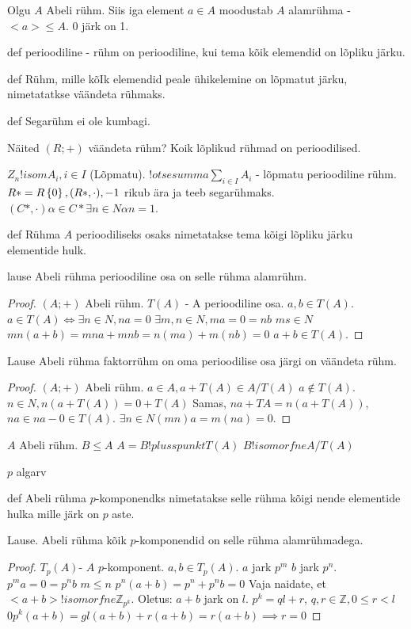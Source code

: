 \documentclass[12pt]{report}
\numberwithin{equation}{section}
\theoremstyle{definition}
\theoremstyle{plain}
\begin{document}
Olgu $A$ Abeli r\"uhm. Siis iga element $a \in A$ moodustab $A$ alamr\"uhma - $<a> \leq A$. $0$ järk on 1.

def perioodiline - r\"uhm on perioodiline, kui tema kõik elemendid on lõpliku järku.

def R\"uhm, mille kõIk elemendid peale \"uhikelemine on lõpmatut järku, nimetatatkse väändeta r\"uhmaks.

def Segar\"uhm ei ole kumbagi.

Näited
$(R;+)$ väändeta rühm?
Koik lõplikud r\"uhmad on perioodilised.

$Z_n !isom A_i , i \in I$ (Lõpmatu). $!otsesumma \sum \limits_{i \in I} A_i$ - lõpmatu perioodiline r\"uhm.
$R* = R \\ \left\lbrace 0 \right\rbrace , (R*,\cdot) , -1$ rikub ära ja teeb segar\"uhmaks. $(C*,\cdot) \alpha \in C* \exists n \in N \alpha n = 1$.

def R\"uhma $A$ perioodiliseks osaks nimetatakse tema kõigi lõpliku järku elementide hulk.

lause Abeli r\"uhma perioodiline osa on selle r\"uhma alamr\"uhm. 

\begin{proof}
$(A;+)$ Abeli r\"uhm.
$T(A)$ - A perioodiline osa.
$a,b \in T(A)$.
$a \in T(A) \iff \exists n \in N , na=0$
$\exists m,n \in N, ma = 0 = nb$
$ms \in N$
$mn(a+b) = mna + mnb = n(ma) + m(nb) = 0$
$a + b \in T(A)$.
\end{proof}

Lause Abeli r\"uhma faktorr\"uhm on oma perioodilise osa järgi on väändeta r\"uhm.

\begin{proof}
$(A;+)$ Abeli r\"uhm.
$a \in A, a + T(A) \in A / T(A)$
$a \not \in T(A)$. 
$ n \in N, n \left( a + T \left(A \right) \right) = 0 + T(A)$
Samas, $na + TA = n \left( a + T \left(A \right) \right)$, $na \in na - 0 \in T(A)$.
$\exists n \in N (mn)a=m(na) = 0.$
\end{proof}

$A$ Abeli r\"uhm.
$B \leq A$
$A = B !plusspunkt T(A)$
$B !isomorfne A / T(A)$

$p$ algarv

def Abeli r\"uhma $p$-komponendks nimetatakse selle r\"uhma kõigi nende elementide hulka mille järk on $p$ aste.

Lause. Abeli r\"uhma kõik $p$-komponendid on selle r\"uhma alamr\"uhmadega.

\begin{proof}
$T_p (A) $- $A$ $p$-komponent.
$a,b \in T_p (A)$.
$a$ jark $p^m$
$b$ jark $p^n$. 
$p^m a = 0 = p^nb$
$m \leq n$
$p^n ( a + b) = p^n  + p^n b = 0$
Vaja naidate, et $<a + b> !isomorfne \mathbb{Z}_{p^k}$.
Oletus: $a + b$ jark on $l$. $p^k = ql + r$, $q,r \in \mathbb{Z}, 0 \leq r < l$
$0  p^k (a + b) = gl(a+b)+ r(a+b) = r(a + b) \implies r = 0$
\end{proof}
\end{document}
